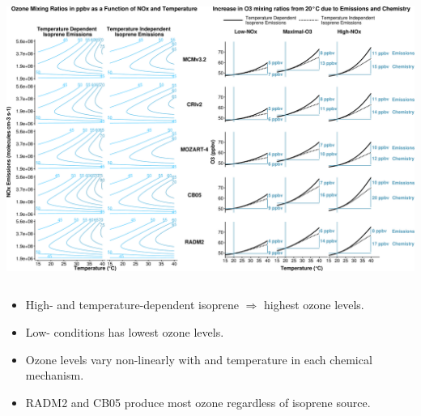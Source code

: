 \begin{GreyBox}
    \vskip-1cm
    \begin{block}{} 
        \begin{center}
            \vspace{7mm}
            \includegraphics[width = \textwidth]{Plotting/results}
        \end{center}
        \begin{columns}[t]
                \begin{flushleft}
                    \begin{WhiteBox}
                        \begin{itemize} \vspace{8mm}
                            \item High- and temperature-dependent isoprene $\Rightarrow$ highest ozone levels. \vspace{13mm}
                            \item Low- conditions has lowest ozone levels. \vspace{13mm}
                            \item Ozone levels vary non-linearly with  and temperature in each chemical mechanism. \vspace{13mm}
                            \item RADM2 and CB05 produce most ozone regardless of isoprene source. %
                        \end{itemize}
                    \end{WhiteBox}
                \end{flushleft}

\end{columns}
\end{block}
\end{GreyBox}
